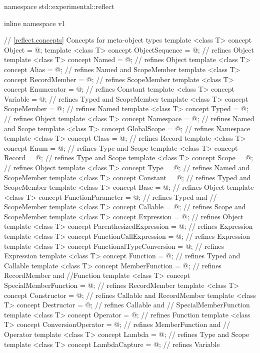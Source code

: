 \begin{std.txt}\color{addclr}
\begin{codeblock}
namespace std::experimental::reflect {
inline namespace v1 {

// \ref{reflect.concepts} Concepts for meta-object types
template <class T> concept Object = @\seebelow@;
template <class T> concept ObjectSequence = @\seebelow@; // refines Object
template <class T> concept Named = @\seebelow@;          // refines Object
template <class T> concept Alias = @\seebelow@;          // refines Named and ScopeMember
template <class T> concept RecordMember = @\seebelow@;   // refines ScopeMember
template <class T> concept Enumerator = @\seebelow@;     // refines Constant
template <class T> concept Variable = @\seebelow@;       // refines Typed and ScopeMember
template <class T> concept ScopeMember = @\seebelow@;    // refines Named
template <class T> concept Typed = @\seebelow@;          // refines Object
template <class T> concept Namespace = @\seebelow@;      // refines Named and Scope
template <class T> concept GlobalScope = @\seebelow@;    // refines Namespace
template <class T> concept Class = @\seebelow@;          // refines Record
template <class T> concept Enum = @\seebelow@;           // refines Type and Scope
template <class T> concept Record = @\seebelow@;         // refines Type and Scope
template <class T> concept Scope = @\seebelow@;          // refines Object
template <class T> concept Type = @\seebelow@;           // refines Named and ScopeMember
template <class T> concept Constant = @\seebelow@;       // refines Typed and ScopeMember
template <class T> concept Base = @\seebelow@;           // refines Object
template <class T> concept FunctionParameter = @\seebelow@; // refines Typed and
                                                          // ScopeMember
template <class T> concept Callable = @\seebelow@;       // refines Scope and ScopeMember
template <class T> concept Expression = @\seebelow@;     // refines Object
template <class T> concept ParenthesizedExpression = @\seebelow@;  // refines Expression
template <class T> concept FunctionCallExpression = @\seebelow@;   // refines Expression
template <class T> concept FunctionalTypeConversion = @\seebelow@; // refines Expression
template <class T> concept Function = @\seebelow@;       // refines Typed and Callable
template <class T> concept MemberFunction = @\seebelow@; // refines RecordMember and
                                                       //Function
template <class T> concept SpecialMemberFunction = @\seebelow@; // refines RecordMember
template <class T> concept Constructor = @\seebelow@;    // refines Callable and RecordMember
template <class T> concept Destructor = @\seebelow@;     // refines Callable and
                                                       // SpecialMemberFunction
template <class T> concept Operator = @\seebelow@;       // refines Function
template <class T> concept ConversionOperator = @\seebelow@; // refines MemberFunction and
                                                           // Operator
template <class T> concept Lambda = @\seebelow@;         // refines Type and Scope
template <class T> concept LambdaCapture = @\seebelow@;  // refines Variable


}}
\end{codeblock}
\end{std.txt}
